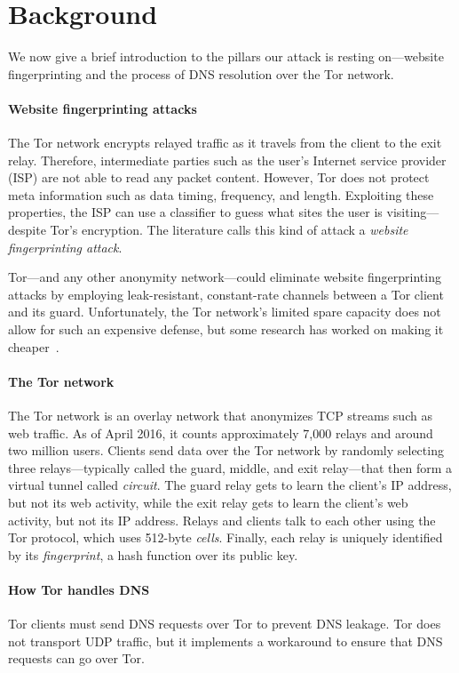 \section{Background}
\label{sec:background}
We now give a brief introduction to the pillars our attack is resting
on---website fingerprinting and the process of DNS resolution over the Tor
network.

\paragraph{Website fingerprinting attacks}
The Tor network encrypts relayed traffic as it travels from the client to the
exit relay.  Therefore, intermediate parties such as the user's Internet service
provider (ISP) are not able to read any packet content.  However, Tor does not
protect meta information such as data timing, frequency, and length.  Exploiting
these properties, the ISP can use a classifier to guess what sites the user is
visiting---despite Tor's encryption.  The literature calls this kind of attack a
\emph{website fingerprinting attack}.

Tor---and any other anonymity network---could eliminate website fingerprinting
attacks by employing leak-resistant, constant-rate channels between a Tor client
and its guard.  Unfortunately, the Tor network's limited spare capacity does not
allow for such an expensive defense, but some research has worked on making it
cheaper~\cite{Cai2014a}.

\paragraph{The Tor network}
The Tor network is an overlay network that anonymizes TCP streams such as web
traffic.  As of April 2016, it counts approximately 7,000 relays and around two
million users.  Clients send data over the Tor network by randomly selecting
three relays---typically called the guard, middle, and exit relay---that then
form a virtual tunnel called \emph{circuit}.  The guard relay gets to learn the
client's IP address, but not its web activity, while the exit relay gets to
learn the client's web activity, but not its IP address.  Relays and clients
talk to each other using the Tor protocol, which uses 512-byte \emph{cells}.
Finally, each relay is uniquely identified by its \emph{fingerprint}, a hash
function over its public key.

\paragraph{How Tor handles DNS}
Tor clients must send DNS requests over Tor to prevent DNS leakage.  Tor
does not transport UDP traffic, but it implements a workaround to ensure that
DNS requests can go over Tor.

